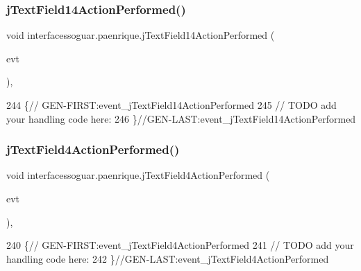 \subsubsection{\texorpdfstring{j\+Text\+Field14\+Action\+Performed()}{jTextField14ActionPerformed()}}
{\footnotesize\ttfamily void interfacessoguar.\+paenrique.\+j\+Text\+Field14\+Action\+Performed (\begin{DoxyParamCaption}\item[{java.\+awt.\+event.\+Action\+Event}]{evt }\end{DoxyParamCaption})\hspace{0.3cm}{\ttfamily [inline]}, {\ttfamily [private]}}


\begin{DoxyCode}
244                                                                              \{\textcolor{comment}{//
      GEN-FIRST:event\_jTextField14ActionPerformed}
245         \textcolor{comment}{// TODO add your handling code here:}
246     \}\textcolor{comment}{//GEN-LAST:event\_jTextField14ActionPerformed}
\end{DoxyCode}
\mbox{\label{classinterfacessoguar_1_1paenrique_ac522a7702d9460bf287a10c52e146d21}} 
\subsubsection{\texorpdfstring{j\+Text\+Field4\+Action\+Performed()}{jTextField4ActionPerformed()}}
{\footnotesize\ttfamily void interfacessoguar.\+paenrique.\+j\+Text\+Field4\+Action\+Performed (\begin{DoxyParamCaption}\item[{java.\+awt.\+event.\+Action\+Event}]{evt }\end{DoxyParamCaption})\hspace{0.3cm}{\ttfamily [inline]}, {\ttfamily [private]}}


\begin{DoxyCode}
240                                                                             \{\textcolor{comment}{//
      GEN-FIRST:event\_jTextField4ActionPerformed}
241         \textcolor{comment}{// TODO add your handling code here:}
242     \}\textcolor{comment}{//GEN-LAST:event\_jTextField4ActionPerformed}
\end{DoxyCode}
\mbox{\label{classinterfacessoguar_1_1paenrique_a936bcab08619d05d934f116096744c06}} 
